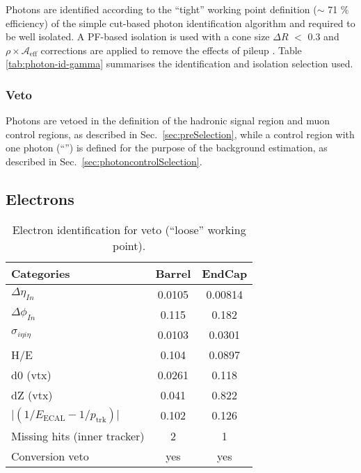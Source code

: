 Photons are identified according to the ``tight'' working point
definition ($\sim$ 71 $\%$ efficiency) of the simple cut-based photon
identification algorithm \cite{photon-id} and required to be well
isolated.  A PF-based isolation is used with a cone size $\Delta R$
$<$ 0.3 and $\rho\times \mathcal{A}_\textrm{eff}$ corrections are applied to remove the
effects of pileup \cite{pf-photon}.  Table \ref{tab:photon-id-gamma}
summarises the identification and isolation selection used.

\subsubsection{Veto}

Photons are vetoed in the definition of the hadronic signal region and
muon control regions, as described in Sec.~\ref{sec:preSelection},
while a control region with one photon (``\gj'') is defined for the
purpose of the background estimation, as described in
Sec.~\ref{sec:photoncontrolSelection}.


\subsection{Electrons}
\label{sec:electron-id}

\begin{table}[h!]
  \caption{Electron identification for veto (``loose'' working point).\label{tab:ele-id}}
  \centering
  \footnotesize
  \begin{tabular}{ lcc }
    \hline
    \hline
    Categories                                               & Barrel    & EndCap    \\
    \hline
    $\Delta \eta_{In}$                                       & 0.0105   & 0.00814  \\
    $\Delta \phi_{In}$                                       & 0.115    & 0.182  \\
    $\sigma_{i\eta i\eta}$                                   & 0.0103    & 0.0301  \\
    H/E                                                      & 0.104    & 0.0897   \\
    d0 (vtx)                                                 & 0.0261    & 0.118  \\
    dZ (vtx)                                                 & 0.041    & 0.822  \\
    $\lvert(1/E_{\textrm{ECAL}} - 1/p_{\textrm{trk}})\rvert$ & 0.102     & 0.126  \\
    Missing hits (inner tracker)                             & 2         & 1         \\
    Conversion veto                                          & yes       & yes   \\
    \hline
    \hline
  \end{tabular}
\end{table}

